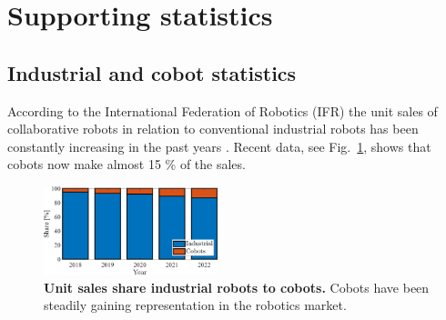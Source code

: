 \newpage
\section{Supporting statistics}
\subsection{Industrial and cobot statistics}\label{sec:robot_statistics}
According to the International Federation of Robotics (IFR) the unit sales of collaborative robots in relation to conventional industrial robots has been constantly increasing in the past years \cite{statista_ir_cobot_share}. Recent data, see Fig.~\ref{fig:industrial_cobot_share}, shows that cobots now make almost 15 \% of the sales.
\begin{figure}[!h]
	\centering
	\includegraphics[width= 0.45\textwidth]{fig/share_industrial_and_cobots.png} 
	\caption{\textbf{Unit sales share industrial robots to cobots.} Cobots have been steadily gaining representation in the robotics market.}
	\label{fig:industrial_cobot_share}
\end{figure}

